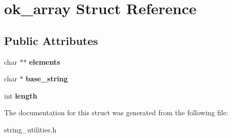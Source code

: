 \hypertarget{structok__array}{}\section{ok\+\_\+array Struct Reference}
\label{structok__array}
\subsection*{Public Attributes}
\begin{DoxyCompactItemize}
\item 
char $\ast$$\ast$ {\bfseries elements}\hypertarget{structok__array_ae35954941500b16a37e47875bcf2d113}{}\label{structok__array_ae35954941500b16a37e47875bcf2d113}

\item 
char $\ast$ {\bfseries base\+\_\+string}\hypertarget{structok__array_aa6bb78efcd51274d5bcaf946d2d932d3}{}\label{structok__array_aa6bb78efcd51274d5bcaf946d2d932d3}

\item 
int {\bfseries length}\hypertarget{structok__array_a6d1bcc323c770d425d7e8734e6c37a07}{}\label{structok__array_a6d1bcc323c770d425d7e8734e6c37a07}

\end{DoxyCompactItemize}


The documentation for this struct was generated from the following file\+:\begin{DoxyCompactItemize}
\item 
string\+\_\+utilities.\+h\end{DoxyCompactItemize}
